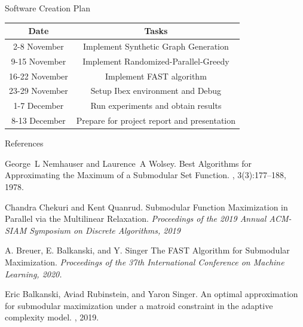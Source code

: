 \documentclass{beamer} %
\begin{document}
\begin{frame}{Software Creation Plan}
\begin{tabular}{||c c||} 
 \hline
 Date & Tasks \\
 \hline\hline
 2-8 November & Implement Synthetic Graph Generation  \\ 
 \hline
 9-15 November & Implement Randomized-Parallel-Greedy \\
 \hline
 16-22 November & Implement FAST algorithm  \\
 \hline
 23-29 November & Setup Ibex environment and Debug  \\
 \hline
 1-7 December & Run experiments and obtain results  \\
 \hline
 8-13 December & Prepare for project report and presentation  \\
 \hline
\end{tabular}
\end{frame}

\begin{frame}{References}
\tiny %
\begin{thebibliography}{99}
     George~L Nemhauser and Laurence~A Wolsey.
	\newblock Best Algorithms for Approximating the Maximum of a Submodular Set Function.
	, 3(3):177--188, 1978.
	
     Chandra Chekuri and Kent Quanrud.
	\newblock Submodular Function Maximization in Parallel via the Multilinear Relaxation.
	\newblock \emph{Proceedings of the 2019 Annual ACM-SIAM Symposium on Discrete Algorithms, 2019}

     A. Breuer, E. Balkanski, and Y. Singer
	\newblock The FAST Algorithm for Submodular Maximization.
	\newblock \emph{Proceedings of the 37th International Conference on Machine Learning, 2020.}
	
	 Eric Balkanski, Aviad Rubinstein, and Yaron Singer.
	\newblock An optimal approximation for submodular maximization under a matroid constraint in the adaptive complexity model.
	, 2019.
	
\end{thebibliography}
\end{frame}
\end{document}
